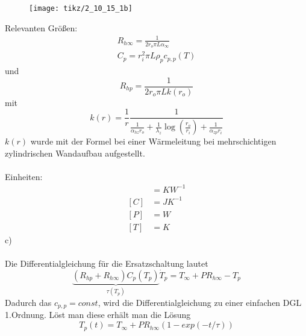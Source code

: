 \begin{figure}[h]
	\centering
	\texttt{[image: tikz/2\_10\_15\_1b]}
\end{figure}
\newline
Relevanten Größen:
\begin{align*}
	R_{h\infty} = \frac{1}{2r_o\pi L \alpha_\infty} \\
	C_p = r^2_i \pi L \rho_p c_{p,p}(T)
\end{align*}
und
\[
	R_{hp} = \frac{1}{2r_o\pi L k(r_o)}
\]
mit
\[
	k(r) = \frac{1}{r}\frac{1}{\frac{1}{\alpha_{hz}r_o} + \frac{1}{\lambda_z}\log\left( \frac{r_o}{r_i}\right) + \frac{1}{\alpha_{zp}r_i}}
\]
$k(r)$ wurde mit der Formel bei einer Wärmeleitung bei mehrschichtigen zylindrischen Wandaufbau aufgestellt.\\ \\
Einheiten:
\begin{align*}
	[R] &= KW^{-1} \\
	[C] &= JK^{-1} \\
	[P] &= W \\
	[T] &= K
\end{align*}
c) \\ \\
Die Differentialgleichung für die Ersatzschaltung lautet
\[
	\underbrace{(R_{hp} + R_{h\infty})C_p(T_p)}_{\tau(T_p)}\dot{T}_p = T_\infty + PR_{h\infty} - T_p
\]
Dadurch das $c_{p,p} = const$, wird die Differentialgleichung zu einer einfachen DGL 1.Ordnung.
Löst man diese erhält man die Lösung
\[
	T_p(t) = T_\infty + PR_{h\infty}(1 - exp(-t / \tau))
\]